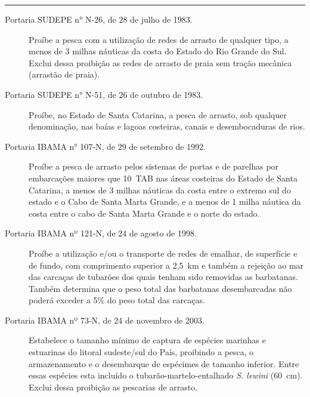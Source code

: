 \documentclass[a4paper,11pt,twoside,showtrims,onecolumn,openright,final]{memoir}
\begin{document}
\begin{table}
\rule{\textwidth}{\normalrulethickness}
\begin{small}
\begin{description}

			      
\item[Portaria SUDEPE n° N-26, de 28 de julho de 1983.] Proíbe a pesca com a utilização de redes de 
                                                       arrasto de qualquer tipo, a menos de 3 milhas náuticas
						       da costa do Estado do Rio Grande do Sul. Exclui dessa
						       proibição as redes de arrasto de praia sem tração
						       mecânica (arrastão de praia).
						       
\item[Portaria SUDEPE n° N-51, de 26 de outubro de 1983.] Proíbe, no Estado de Santa Catarina, a pesca de arrasto, 
                                                         sob qualquer denominação, nas baías e lagoas costeiras, 
							 canais e desembocaduras de rios.


\item[Portaria IBAMA n° 107-N, de 29 de setembro de 1992.] Proíbe a pesca de arrasto pelos sistemas de portas 
                                                          e de parelhas por embarcações maiores que 10~TAB 
							  nas áreas costeiras do Estado de Santa Catarina, 
							  a menos de 3 milhas náuticas da costa entre o extremo sul 
							  do estado e o Cabo de Santa Marta Grande, e a menos 
							  de 1 milha náutica da costa entre o cabo de Santa Marta 
							  Grande e o norte do estado.

\item[Portaria IBAMA nº 121-N, de 24 de agosto de 1998.] Proíbe a utilização e/ou o transporte de redes de emalhar, 
                                                        de superfície e de fundo, com comprimento superior a 2,5~km
							e também a rejeição ao mar das carcaças de tubarões dos quais tenham 
							sido removidas as barbatanas. Também determina que o peso total 
							das barbatanas desembarcadas não poderá exceder a 5\% do peso total 
							das carcaças.
							
\item[Portaria IBAMA nº 73-N, de 24 de novembro de 2003.] Estabelece o tamanho mínimo de captura de espécies marinhas 
                                                            e estuarinas do litoral sudeste/sul do País, proibindo
							    a pesca, o armazenamento e o desembarque de espécimes
							    de tamanho inferior. Entre essas espécies esta incluído
							    o tubarão-martelo-entalhado \emph{S. lewini} (60~cm).
							    Exclui dessa proibição as pescarias de arrasto.


\end{description}
\end{small}
\end{table}
\end{document}
